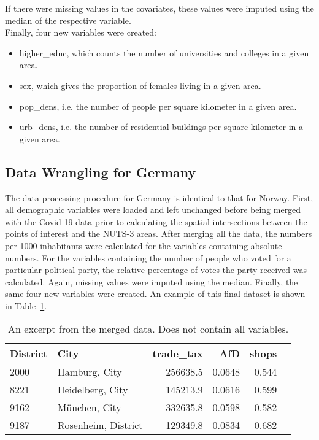 If there were missing values in the covariates, these values were imputed using the median of the respective variable. \\
Finally, four new variables were created:
\begin{itemize}
    \item[1.] higher\_educ, which counts the number of universities and colleges in a given area.
    \item[2.] sex, which gives the proportion of females living in a given area.
    \item[3.] pop\_dens, i.e. the number of people per square kilometer in a given area.
    \item[3.] urb\_dens, i.e. the number of residential buildings per square kilometer in a given area.
\end{itemize}
\subsection*{Data Wrangling for Germany}
The data processing procedure for Germany is identical to that for Norway. First, all demographic variables were loaded and left unchanged before being merged with the Covid-19 data prior to calculating the spatial intersections between the points of interest and the NUTS-3 areas. After merging all the data, the numbers per 1000 inhabitants were calculated for the variables containing absolute numbers. For the variables containing the number of people who voted for a particular political party, the relative percentage of votes the party received was calculated. Again, missing values were imputed using the median.
Finally, the same four new variables were created. An example of this final dataset is shown in Table~\ref{finalGermany}.
\begin{table}[H] 
\caption{An excerpt from the merged data. Does not contain all variables.\label{finalGermany}}
\begin{tabular}{l l r r r r}
\toprule
\textbf{District}	& \textbf{City}	& \textbf{trade\_tax}& \textbf{AfD} & \textbf{shops}\\
\midrule
2000 & Hamburg, City & 256638.5  & 0.0648 & 0.544\\
8221 & Heidelberg, City & 145213.9  & 0.0616 & 0.599\\
9162 & München, City &  332635.8  &  0.0598 & 0.582\\
9187 & Rosenheim, District & 129349.8 & 0.0834 & 0.682\\
\bottomrule
\end{tabular}
\end{table}